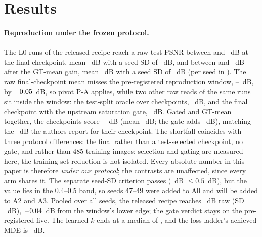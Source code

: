 \section{Results}
\label{sec:experiments}



\paragraph{Reproduction under the frozen protocol.} The  L0 runs of the released
recipe reach a raw test PSNR between  and ~dB at the final
checkpoint, mean ~dB with a seed SD of ~dB, and between 
and ~dB after the GT-mean gain, mean ~dB with a seed SD of
~dB (per seed in ). The raw final-checkpoint mean misses the pre-registered reproduction window,
--~dB, by $-0.05$~dB, so pivot P-A applies, while two other raw reads of the same runs
sit inside the window: the test-split oracle over checkpoints, ~dB, and the
final checkpoint with the upstream saturation gate, ~dB. Gated and GT-mean
together, the checkpoints score --~dB (mean ~dB; the
gate adds ~dB), matching the ~dB the authors report for their
checkpoint. The shortfall coincides with three protocol differences: the final rather than a
test-selected checkpoint, no gate, and  rather than 485 training images; selection
and gating are measured here, the training-set reduction is not isolated.
Every absolute number in this paper is therefore \emph{under our protocol}; the contrasts
are unaffected, since every arm shares it. The separate seed-SD criterion passes (~dB $\le 0.5$~dB), but the value lies in
the $0.4$--$0.5$ band, so seeds 47--49 were added to A0 and will be added to A2 and A3. Pooled over all
 seeds, the released recipe reaches ~dB raw (SD ~dB),
$-0.04$~dB from the window's lower edge; the gate verdict stays on the
pre-registered five. The learned $k$ ends at a median of ,
and the loss ladder's achieved MDE is ~dB.



